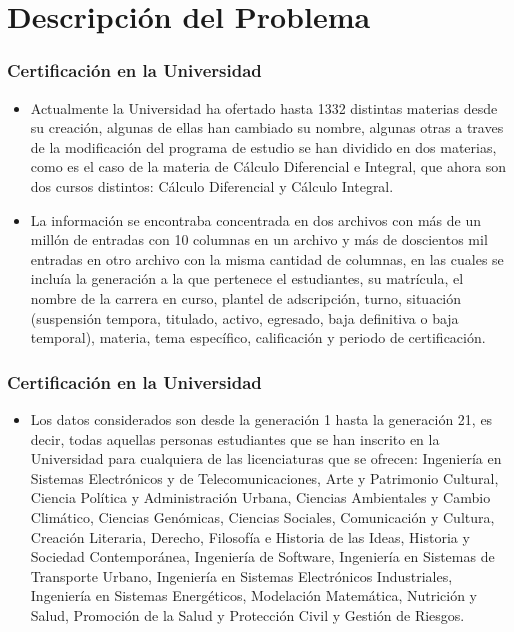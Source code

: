 \documentclass[xcolor=dvipsnames]{beamer}
\begin{document}
\section{Descripci\'on del Problema}


\begin{frame}\frametitle{Certificaci\'on en la Universidad}
\begin{itemize}

\item Actualmente la Universidad ha ofertado hasta 1332 distintas materias desde su creaci\'on, algunas de ellas han cambiado su nombre, algunas otras a traves de la modificaci\'on del programa de estudio se han dividido en dos materias, como es el caso de la materia de C\'alculo Diferencial e Integral, que ahora son dos cursos distintos: C\'alculo Diferencial y C\'alculo Integral.



\item La informaci\'on se encontraba concentrada en dos archivos con m\'as de un mill\'on de entradas con 10 columnas en un archivo y m\'as de doscientos mil entradas en otro archivo con la misma cantidad de columnas, en las cuales se inclu\'ia la generaci\'on a la que pertenece el estudiantes, su matr\'icula, el nombre de la carrera en curso,  plantel de adscripci\'on, turno, situaci\'on (suspensi\'on tempora, titulado,   activo,  egresado,  baja definitiva o baja temporal), materia, tema espec\'ifico, calificaci\'on y periodo de certificaci\'on.


\end{itemize}






\end{frame}


\begin{frame}\frametitle{Certificaci\'on en la Universidad}
\begin{itemize}

\item Los datos considerados son desde la generaci\'on 1 hasta la generaci\'on 21, es decir, todas aquellas personas estudiantes que se han inscrito en la Universidad para cualquiera de las licenciaturas que se ofrecen: Ingenier\'ia en Sistemas Electr\'onicos y de Telecomunicaciones, Arte y Patrimonio Cultural, Ciencia Pol\'itica y Administraci\'on Urbana, Ciencias Ambientales y Cambio Clim\'atico, Ciencias Gen\'omicas, Ciencias Sociales, Comunicaci\'on y Cultura, Creaci\'on Literaria, Derecho, Filosof\'ia e Historia de las Ideas, Historia y Sociedad Contempor\'anea, Ingenier\'ia de Software, Ingenier\'ia en Sistemas de Transporte Urbano, Ingenier\'ia en Sistemas Electr\'onicos Industriales, Ingenier\'ia en Sistemas Energ\'eticos, Modelaci\'on Matem\'atica, Nutrici\'on y Salud, Promoci\'on de la Salud y  Protecci\'on Civil y Gesti\'on de Riesgos.

\end{itemize}




\end{frame}
\end{document}
